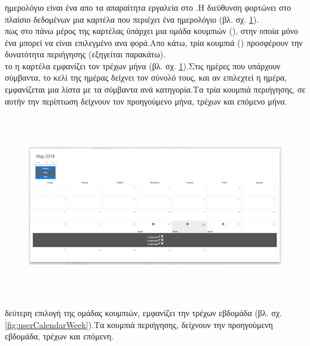 \subsubsection*{}
 ημερολόγιο είναι ένα απο τα απαραίτητα εργαλεία στο .Η διεύθυνση  φορτώνει στο πλαίσιο δεδομένων μια καρτέλα που περιέχει ένα ημερολόγιο (βλ. σχ. \ref{fig:userCalendar}).\\
 πως στο πάνω μέρος της καρτέλας ύπάρχει μια ομάδα κουμπιών (), στην οποία μόνο ένα μπορεί να είναι επιλεγμένο ανα φορά.Απο κάτω, τρία κουμπιά () προσφέρουν την δυνατότητα περιήγησης (εξηγείται παρακάτω).\\
 το  η καρτέλα εμφανίζει τον τρέχων μήνα (βλ. σχ. \ref{fig:userCalendar}).Στις ημέρες που υπάρχουν σύμβαντα, το κελί της ημέρας δείχνει τον σύνολό τους, και αν επιλεχτεί η ημέρα, εμφανίζεται μια λίστα με τα σύμβαντα ανά κατηγορία.Τα τρία κουμπιά περιήγησης, σε αυτήν την περίπτωση δείχνουν τον προηγούμενο μήνα, τρέχων και επόμενο μήνα.

\begin{figure}[!htb]
\includegraphics[width=\columnwidth, height=8cm]{images/userCalendar.png}
\caption{}
\label{fig:userCalendar}
\end{figure}

\pagebreak

 δεύτερη επιλογή της ομάδας κουμπιών, εμφανίζει την τρέχων εβδομάδα (βλ. σχ. \ref{fig:userCalendarWeek}).Τα κουμπιά περιήγησης, δείχνουν την προηγούμενη εβδομάδα, τρέχων και επόμενη.

